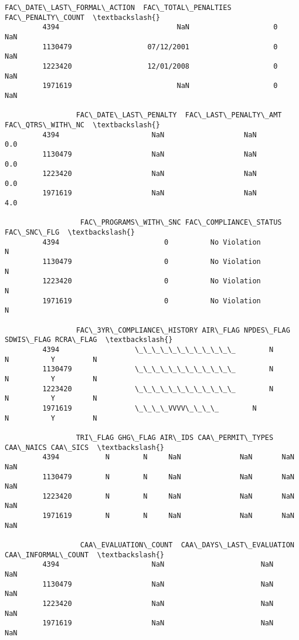 \documentclass[11pt]{article}
\begin{document}
\begin{Verbatim}[commandchars=\\\{\}]
                 FAC\_DATE\_LAST\_FORMAL\_ACTION  FAC\_TOTAL\_PENALTIES  FAC\_PENALTY\_COUNT  \textbackslash{}
         4394                            NaN                    0                NaN   
         1130479                  07/12/2001                    0                NaN   
         1223420                  12/01/2008                    0                NaN   
         1971619                         NaN                    0                NaN   
         
                 FAC\_DATE\_LAST\_PENALTY  FAC\_LAST\_PENALTY\_AMT  FAC\_QTRS\_WITH\_NC  \textbackslash{}
         4394                      NaN                   NaN               0.0   
         1130479                   NaN                   NaN               0.0   
         1223420                   NaN                   NaN               0.0   
         1971619                   NaN                   NaN               4.0   
         
                  FAC\_PROGRAMS\_WITH\_SNC FAC\_COMPLIANCE\_STATUS FAC\_SNC\_FLG  \textbackslash{}
         4394                         0          No Violation           N   
         1130479                      0          No Violation           N   
         1223420                      0          No Violation           N   
         1971619                      0          No Violation           N   
         
                 FAC\_3YR\_COMPLIANCE\_HISTORY AIR\_FLAG NPDES\_FLAG SDWIS\_FLAG RCRA\_FLAG  \textbackslash{}
         4394                  \_\_\_\_\_\_\_\_\_\_\_\_        N          N          Y         N   
         1130479               \_\_\_\_\_\_\_\_\_\_\_\_        N          N          Y         N   
         1223420               \_\_\_\_\_\_\_\_\_\_\_\_        N          N          Y         N   
         1971619               \_\_\_\_VVVV\_\_\_\_        N          N          Y         N   
         
                 TRI\_FLAG GHG\_FLAG AIR\_IDS CAA\_PERMIT\_TYPES CAA\_NAICS CAA\_SICS  \textbackslash{}
         4394           N        N     NaN              NaN       NaN      NaN   
         1130479        N        N     NaN              NaN       NaN      NaN   
         1223420        N        N     NaN              NaN       NaN      NaN   
         1971619        N        N     NaN              NaN       NaN      NaN   
         
                  CAA\_EVALUATION\_COUNT  CAA\_DAYS\_LAST\_EVALUATION  CAA\_INFORMAL\_COUNT  \textbackslash{}
         4394                      NaN                       NaN                 NaN   
         1130479                   NaN                       NaN                 NaN   
         1223420                   NaN                       NaN                 NaN   
         1971619                   NaN                       NaN                 NaN   
         

\end{Verbatim}
\end{document}
